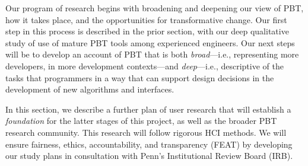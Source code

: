 Our program of research begins with broadening and deepening our view of PBT,
how it takes place, and the opportunities for transformative change. Our first
step in this process is described in the prior section, with our deep qualitative
study of use of mature PBT tools among experienced engineers. Our next steps
will be to develop an account of PBT that is both \emph{broad}---i.e., representing
more developers, in more development contexts---and \emph{deep}---i.e., descriptive
of the tasks that programmers in a way that can support design decisions
in the development of new algorithms and interfaces.


In this section, we describe a further plan of user research that will
establish a {\em foundation} for the latter stages of this project, as well as
the broader PBT research community. This research will follow rigorous HCI methods.
We will ensure fairness, ethics, accountability, and transparency (FEAT)
by developing our study plans in consultation with Penn's Institutional Review Board (IRB).

%


